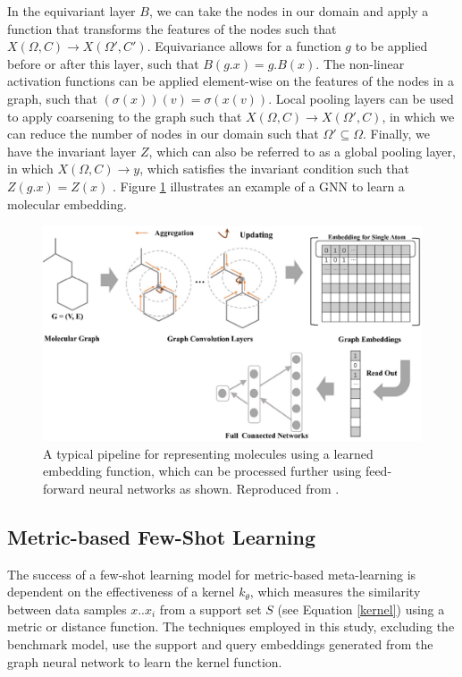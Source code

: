 In the equivariant layer $B$, we can take the nodes in our domain and apply a function that transforms the features of the nodes such that $X(\Omega, C) \rightarrow X(\Omega', C')$. Equivariance allows for a function $g$ to be applied before or after this layer, such that $B(g.x) = g.B(x)$. The non-linear activation functions can be applied element-wise on the features of the nodes in a graph, such that $(\sigma(x))(v) = \sigma(x(v))$. Local pooling layers can be used to apply coarsening to the graph such that $X(\Omega, C) \rightarrow X(\Omega', C)$, in which we can reduce the number of nodes in our domain such that $\Omega' \subseteq \Omega$. Finally, we have the invariant layer $Z$, which can also be referred to as a global pooling layer, in which $X(\Omega, C) \rightarrow y$, which satisfies the invariant condition such that $Z(g.x) = Z(x)$ \citep{bronstein2021geometric}. Figure \ref{fig:neuralgraphfingerprint} illustrates an example of a GNN to learn a molecular embedding.

\begin{figure}[h]
	\centering
	\includegraphics[width=0.9\linewidth]{img/graph_mol_embedding.png}
	\caption[Learned Embedding through a GCN]{A typical pipeline for representing molecules using a learned embedding function, which can be processed further using feed-forward neural networks as shown. Reproduced from \citet{jiang2021could}.}
	\label{fig:neuralgraphfingerprint}
  \end{figure}

\subsection{Metric-based Few-Shot Learning}

The success of a few-shot learning model for metric-based meta-learning is dependent on the effectiveness of a kernel $k_\theta$, which measures the similarity between data samples ${x..x_i}$ from a support set $S$ (see Equation \ref{kernel}) using a metric or distance function. The techniques employed in this study, excluding the benchmark model, use the support and query embeddings generated from the graph neural network to learn the kernel function.

